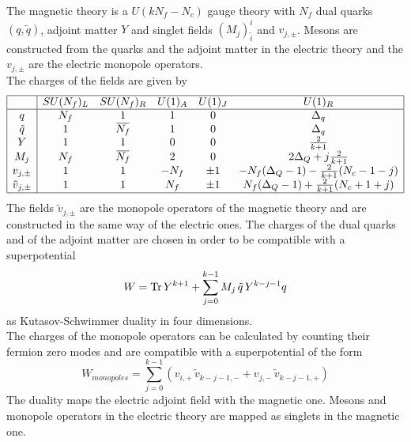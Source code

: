 The magnetic theory is a $U(k N_f - N_c)$ gauge theory with $N_f$ dual quarks $(q,\tilde{q})$, adjoint matter $Y$ and singlet fields $(M_j)^{i}_{\tilde{i}}$ and $v_{j,\pm}$. Mesons are constructed from the quarks and the adjoint matter in the electric theory and the $v_{j,\pm}$ are the electric monopole operators.\\
The charges of the fields are given by
\begin{equation}
\begin{array}{ | c | c c c c c | } 
 \hline
  & SU(N_f)_L & SU(N_f)_R & U(1)_A & U(1)_J  & U(1)_R   \\
 \hline
 q & N_f & 1& 1 & 0   & \Delta_q  \\  
 \tilde{q} & 1 & \overbar{N_f} & 1 & 0 & \Delta_q      \\  
  Y & 1 & 1  & 0 & 0 & \frac{2}{k+1}  \\ 
  M_j & N_f & \overbar{N_f} & 2  &  0& 2 \Delta_Q + j \frac{2}{k+1} \\
  v_{j,\pm} & 1  &1   & - N_f & \pm 1 & -N_f (\Delta_Q-1 ) - \frac{2}{k+1} (N_c-1 - j) \\
 \tilde{v}_{j,\pm} & 1  &1   & N_f & \pm 1 & N_f (\Delta_Q-1 ) + \frac{2}{k+1} (N_c + 1 + j) \\
 \hline
\end{array}
\label{tab:kim-park-magnetic}
\end{equation}
The fields $\tilde{v}_{j,\pm}$ are the monopole operators of the magnetic theory and are constructed in the same way of the electric ones.
The charges of the dual quarks and of the adjoint matter are chosen in order to be compatible with a superpotential 
\begin{equation}
W = \mathrm{Tr } \,{ Y^{k+1}} + \sum_{j=0}^{k-1} M_j \, \tilde{q}\, Y^{k - j - 1} q 
\end{equation}
as Kutasov-Schwimmer duality in four dimensions.\\
The charges of the monopole operators can be calculated by counting their fermion zero modes and are compatible with a superpotential of the form
\begin{equation}
W_{monopoles} = \sum_{j=0}^{k-1} \left(   v_{i,+} \, \tilde{v}_{k-j-1,-} + v_{j,-} \, \tilde{v}_{k-j-1,+} \right)
\label{eqn:kimpark_superpotential_monopoles}
\end{equation}
The duality maps the electric adjoint field with the magnetic one.
Mesons and monopole operators in the electric theory are mapped as singlets in the magnetic one. 